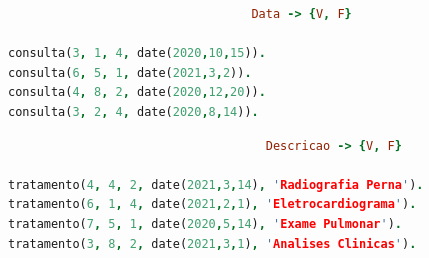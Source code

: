 \documentclass[a4paper, 11pt]{article}
\begin{document}
\vspace{1.5cm}

\begin{lstlisting}[language=Prolog, caption={Base de conhecimento de \texttt{consulta}}]
% Extensao do predicado consulta: #Idmedico, #Idutente, #Idcentro, 
                                  Data -> {V, F}

consulta(3, 1, 4, date(2020,10,15)).
consulta(6, 5, 1, date(2021,3,2)).
consulta(4, 8, 2, date(2020,12,20)).
consulta(3, 2, 4, date(2020,8,14)).
\end{lstlisting}

\vspace{1.5cm}

\begin{lstlisting}[language=Prolog, caption={Base de conhecimento de \texttt{tratamento}}]
% Extensao do predicado tratamento: #IdStaff, #Idutente, #Idcentro, Data,
                                    Descricao -> {V, F}

tratamento(4, 4, 2, date(2021,3,14), 'Radiografia Perna').
tratamento(6, 1, 4, date(2021,2,1), 'Eletrocardiograma').
tratamento(7, 5, 1, date(2020,5,14), 'Exame Pulmonar').
tratamento(3, 8, 2, date(2021,3,1), 'Analises Clinicas').
\end{lstlisting}
\end{document}
